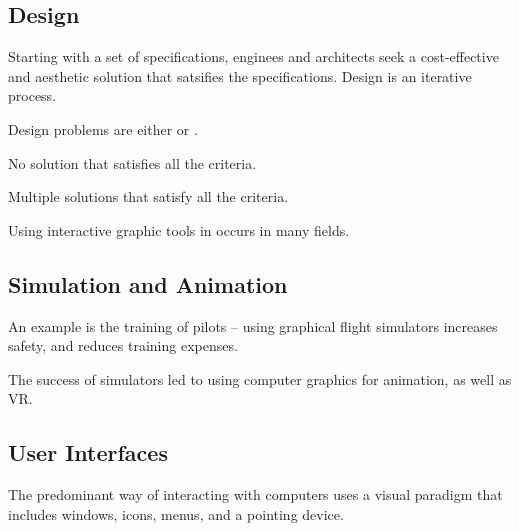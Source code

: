 \documentclass[\main/notes.tex]{subfiles}
\begin{document}
			\subsection{Design}
				Starting with a set of specifications, enginees and architects seek a cost-effective and aesthetic solution that satsifies the specifications. Design is an iterative process.

				Design problems are either  or .
				\begin{description}[nosep]
					\item[Overdetermined] No solution that satisfies all the criteria.
					\item[Underdetermined] Multiple solutions that satisfy all the criteria.
				\end{description}

				Using interactive graphic tools in  occurs in many fields.
			\subsection{Simulation and Animation}
				An example is the training of pilots -- using graphical flight simulators increases safety, and reduces training expenses.

				The success of simulators led to using computer graphics for animation, as well as VR.
			\subsection{User Interfaces}
				The predominant way of interacting with computers uses a visual paradigm that includes windows, icons, menus, and a pointing device.
\end{document}
